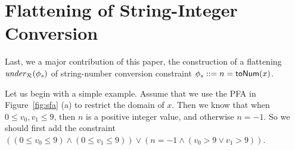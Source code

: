 \documentclass[sigplan,review,anonymous]{acmart}\settopmatter{printfolios=true,printccs=false,printacmref=false}
\begin{document}
%
%
%
%
%
%
%
%



\section{Flattening of String-Integer Conversion} \label{section:s2i}

Last, we a major contribution of this paper, 
the construction of a flattening $\mathit{under}_{\mathcal{R}}(\phi_s)$ of string-number conversion constraint $\phi_s ::= n=\mbox{\textsf{toNum}($x$)}$. 

Let us begin with a simple example. Assume that we use the PFA in Figure~\ref{fig:sfa} (a) to restrict the domain of $x$. Then we know that when $0\leq v_0,v_1 \leq 9$, then $n$ is a positive integer value, and otherwise $n =-1$. So we should first add the constraint $ ((0\leq v_0\leq 9) \wedge (0\leq v_1\leq 9)) \vee (n=-1 \wedge (v_0 >9 \vee v_1 >9))$.
\end{document}
